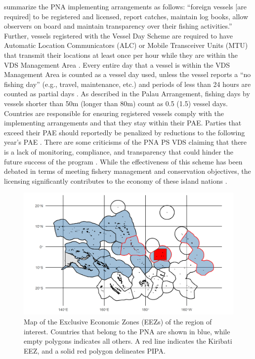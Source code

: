 \documentclass[9pttwoside,lineno]{pnas-new}
\begin{document}
\cite{yeeting2018stabilising} summarize the PNA implementing arrangements as follows: “foreign vessels [are required] to be registered and licensed, report catches, maintain log books, allow observers on board and maintain transparency over their fishing activities.” Further, vessels registered with the Vessel Day Scheme are required to have Automatic Location Communicators (ALC) or Mobile Transceiver Units (MTU) that transmit their locations at least once per hour while they are within the VDS Management Area \citep{PNA2016}. Every entire day that a vessel is within the VDS Management Area is counted as a vessel day used, unless the vessel reports a “no fishing day” (e.g., travel, maintenance, etc.) and periods of less than 24 hours are counted as partial days \citep{PNA2016}.  As described in the Palau Arrangement, fishing days by vessels shorter than 50m (longer than 80m) count as 0.5 (1.5) vessel days. Countries are responsible for ensuring registered vessels comply with the implementing arrangements and that they stay within their PAE. Parties that exceed their PAE should reportedly be penalized by reductions to the following year’s PAE \citep{PNA2016}. There are some criticisms of the PNA PS VDS claiming that there is a lack of monitoring, compliance, and transparency that could hinder the future success of the program \citep{Arnason2014,yeeting2018stabilising}. While the effectiveness of this scheme has been
debated in terms of meeting fishery management and conservation
objectives, the licensing significantly contributes to the economy of
these island nations \citep{havice_2010}.

\begin{figure}
\centering
\includegraphics{img/PNA_map.png}
\caption{\label{fig:PNA_map}Map of the Exclusive
Economic Zones (EEZs) of the region of interest. Countries that belong
to the PNA are shown in blue, while empty polygons indicates all others.
A red line indicates the Kiribati EEZ, and a solid red polygon
delineates PIPA.}
\end{figure}
\end{document}
